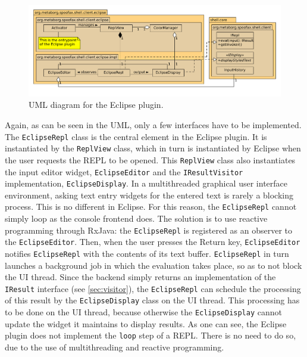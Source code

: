 \begin{figure}[h]
  \includegraphics[width=\textwidth]{uml-eclipse}
  \caption{UML diagram for the Eclipse plugin.}
  \label{fig:uml-eclipse}
\end{figure}

Again, as can be seen in the UML, only a few interfaces have to be implemented.
The \texttt{EclipseRepl} class is the central element in the Eclipse plugin.
It is instantiated by the \texttt{ReplView} class, which in turn is
instantiated by Eclipse when the user requests the REPL to be opened. This
\texttt{ReplView} class also instantiates the input editor widget,
\texttt{EclipseEditor} and the \texttt{IResultVisitor} implementation,
\texttt{EclipseDisplay}.
In a multithreaded graphical user interface environment, asking text entry
widgets for the entered text is rarely a blocking process. This is no different
in Eclipse. For this reason, the \texttt{EclipseRepl} cannot simply loop as the
console frontend does. The solution is to use reactive programming through RxJava:
the \texttt{EclipseRepl} is registered as an observer to the
\texttt{EclipseEditor}. Then, when the user presses the Return key,
\texttt{EclipseEditor} notifies \texttt{EclipseRepl} with the contents of its
text buffer. \texttt{EclipseRepl} in turn launches a background job in which the
evaluation takes place, so as to not block the UI thread. Since the backend
simply returns an implementation of the \texttt{IResult} interface (see
\cref{sec:visitor}), the \texttt{EclipseRepl} can schedule the processing of this
result by the \texttt{EclipseDisplay} class on the UI thread. This processing
has to be done on the UI thread, because otherwise the \texttt{EclipseDisplay}
cannot update the widget it maintains to display results.
As one can see, the Eclipse plugin does not implement the \texttt{loop} step of
a REPL. There is no need to do so, due to the use of multithreading and reactive
programming.

